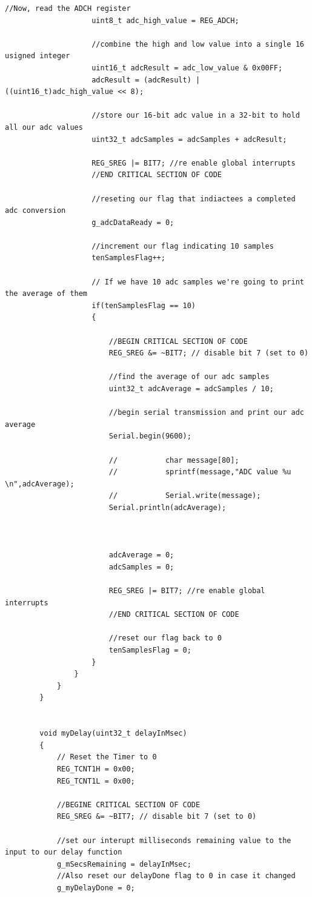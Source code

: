 \documentclass[11pt,pdftex,portrait,letterpaper]{article}
\begin{document}
\begin{lstlisting}[caption={Program 2}, label=l:programx]
					//Now, read the ADCH register
					uint8_t adc_high_value = REG_ADCH;
					
					//combine the high and low value into a single 16 usigned integer
					uint16_t adcResult = adc_low_value & 0x00FF;
					adcResult = (adcResult) | ((uint16_t)adc_high_value << 8);
					
					//store our 16-bit adc value in a 32-bit to hold all our adc values
					uint32_t adcSamples = adcSamples + adcResult; 
					
					REG_SREG |= BIT7; //re enable global interrupts
					//END CRITICAL SECTION OF CODE 
					
					//reseting our flag that indiactees a completed adc conversion
					g_adcDataReady = 0;
					
					//increment our flag indicating 10 samples
					tenSamplesFlag++;
					
					// If we have 10 adc samples we're going to print the average of them
					if(tenSamplesFlag == 10)
					{
						
						//BEGIN CRITICAL SECTION OF CODE
						REG_SREG &= ~BIT7; // disable bit 7 (set to 0)
						
						//find the average of our adc samples
						uint32_t adcAverage = adcSamples / 10;
						
						//begin serial transmission and print our adc average
						Serial.begin(9600);
						
						//           char message[80];
						//           sprintf(message,"ADC value %u \n",adcAverage);
						//           Serial.write(message);
						Serial.println(adcAverage);
						
						
						
						adcAverage = 0;
						adcSamples = 0;
						
						REG_SREG |= BIT7; //re enable global interrupts
						//END CRITICAL SECTION OF CODE 
						
						//reset our flag back to 0
						tenSamplesFlag = 0;
					}
				}
			}
		}      
		
		
		void myDelay(uint32_t delayInMsec)
		{
			// Reset the Timer to 0
			REG_TCNT1H = 0x00;
			REG_TCNT1L = 0x00;
			
			//BEGINE CRITICAL SECTION OF CODE
			REG_SREG &= ~BIT7; // disable bit 7 (set to 0)
			
			//set our interupt milliseconds remaining value to the input to our delay function
			g_mSecsRemaining = delayInMsec; 
			//Also reset our delayDone flag to 0 in case it changed
			g_myDelayDone = 0;
			

\end{lstlisting}
\end{document}
